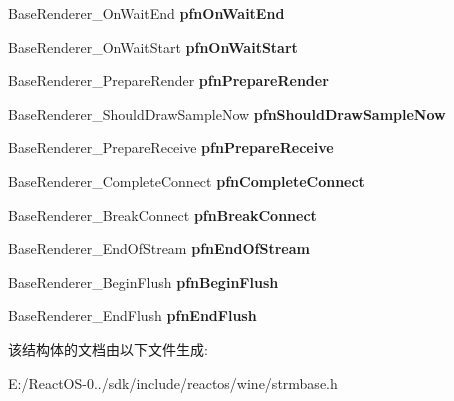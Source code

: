\begin{DoxyCompactItemize}
\item 
\mbox{\label{struct_base_renderer_func_table_a2cb3d60435fc10ed73a20951055bed12}} 
Base\+Renderer\+\_\+\+On\+Wait\+End {\bfseries pfn\+On\+Wait\+End}
\item 
\mbox{\label{struct_base_renderer_func_table_a3ada5a9f08f3e1b819c50fb32975d1d3}} 
Base\+Renderer\+\_\+\+On\+Wait\+Start {\bfseries pfn\+On\+Wait\+Start}
\item 
\mbox{\label{struct_base_renderer_func_table_ac71c1830f7203b8a0828fe718ee3076c}} 
Base\+Renderer\+\_\+\+Prepare\+Render {\bfseries pfn\+Prepare\+Render}
\item 
\mbox{\label{struct_base_renderer_func_table_a22749a0ee1c2e72b82713f28a092e3a0}} 
Base\+Renderer\+\_\+\+Should\+Draw\+Sample\+Now {\bfseries pfn\+Should\+Draw\+Sample\+Now}
\item 
\mbox{\label{struct_base_renderer_func_table_afe563baa8d7b7c7d8b91d38a200d9552}} 
Base\+Renderer\+\_\+\+Prepare\+Receive {\bfseries pfn\+Prepare\+Receive}
\item 
\mbox{\label{struct_base_renderer_func_table_aa0856fdb354a682b933338ff746b251c}} 
Base\+Renderer\+\_\+\+Complete\+Connect {\bfseries pfn\+Complete\+Connect}
\item 
\mbox{\label{struct_base_renderer_func_table_ab177e5958e2b36005ba0d0f1e84026da}} 
Base\+Renderer\+\_\+\+Break\+Connect {\bfseries pfn\+Break\+Connect}
\item 
\mbox{\label{struct_base_renderer_func_table_a42dcf44e1cd535463201ad8cf16726c2}} 
Base\+Renderer\+\_\+\+End\+Of\+Stream {\bfseries pfn\+End\+Of\+Stream}
\item 
\mbox{\label{struct_base_renderer_func_table_ad769e35daabb54d2781adbd46cb603e6}} 
Base\+Renderer\+\_\+\+Begin\+Flush {\bfseries pfn\+Begin\+Flush}
\item 
\mbox{\label{struct_base_renderer_func_table_a55583cc88953dae1cbb36bb8fc7e5502}} 
Base\+Renderer\+\_\+\+End\+Flush {\bfseries pfn\+End\+Flush}
\end{DoxyCompactItemize}


该结构体的文档由以下文件生成\+:\begin{DoxyCompactItemize}
\item 
E\+:/\+React\+O\+S-\/0../sdk/include/reactos/wine/strmbase.\+h\end{DoxyCompactItemize}
